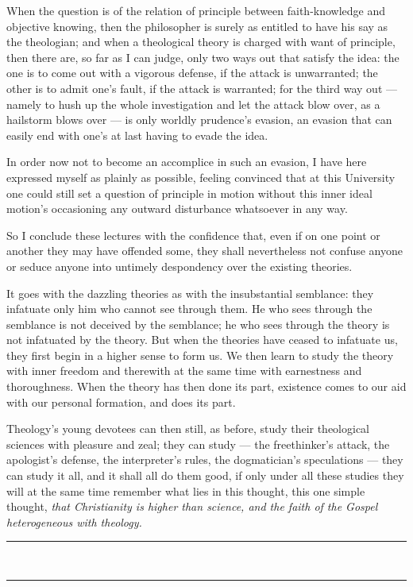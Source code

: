 \documentclass[12pt,a4paper]{book}
\begin{document}
When the question is of the relation of principle between faith-knowledge and objective knowing, then the
philosopher is surely as entitled to have his say as the theologian; and when a theological theory is charged
with want of principle, then there are, so far as I can judge, only two ways out that satisfy the idea: the
one is to come out with a vigorous defense, if the attack is unwarranted; the other is to admit one's fault,
if the attack is warranted; for the third way out --- namely to hush up the whole investigation and let the
attack blow over, as a hailstorm blows over --- is only worldly prudence's evasion, an evasion that can
easily end with one's at last having to evade the idea.

In order now not to become an accomplice in such an evasion, I have here expressed myself as plainly as
possible, feeling convinced that at this University one could still set a question of principle in motion
without this inner ideal motion's occasioning any outward disturbance whatsoever in any way.

So I conclude these lectures with the confidence that, even if on one point or another they may have offended
some, they shall nevertheless not confuse anyone or seduce anyone into untimely despondency over the existing
theories.

It goes with the dazzling theories as with the insubstantial semblance: they infatuate only him who cannot
see through them. He who sees through the semblance is not deceived by the semblance; he who sees through the
theory is not infatuated by the theory. But when the theories have ceased to infatuate us, they first begin in
a higher sense to form us. We then learn to study the theory with inner freedom and therewith at the same time
with earnestness and thoroughness. When the theory has then done its part, existence comes to our aid with our
personal formation, and does its part.

Theology's young devotees can then still, as before, study their theological sciences with pleasure and zeal;
they can study --- the freethinker's attack, the apologist's defense, the interpreter's rules, the
dogmatician's speculations --- they can study it all, and it shall all do them good, if only under all these
studies they will at the same time remember what lies in this thought, this one simple thought, \emph{that
Christianity is higher than science, and the faith of the Gospel heterogeneous with theology.}

\begin{center}
\rule{0.30\textwidth}{0.4pt}\\[2pt]
\rule{0.30\textwidth}{0.4pt}
\end{center}
\end{document}
